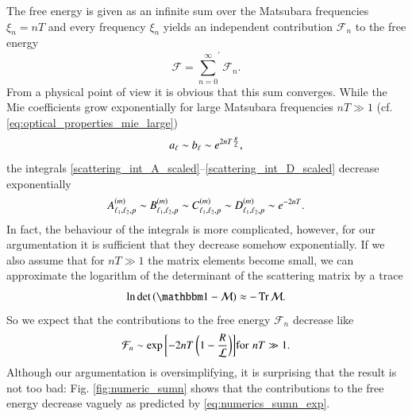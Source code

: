 The free energy is given as an infinite sum over the Matsubara frequencies
$\xi_n=nT$ and every frequency $\xi_n$ yields an independent
contribution $\mathcal{F}_n$ to the free energy
\begin{equation}
\mathcal{F} = {\sum_{n=0}^\infty}^\prime \mathcal{F}_n.
\end{equation}
From a physical point of view it is obvious that this sum converges.
While the Mie coefficients grow exponentially for large Matsubara
frequencies $nT\gg1$ (cf. \eqref{eq:optical_properties_mie_large})
\begin{equation}
a_\ell \sim b_\ell \sim e^{2nT \frac{R}{\mathcal{L}}},
\end{equation}
the integrals \eqref{scattering_int_A_scaled}--\eqref{scattering_int_D_scaled} decrease exponentially
\begin{equation}
A_{\ell_1,\ell_2,p}^{(m)} \sim B_{\ell_1,\ell_2,p}^{(m)} \sim C_{\ell_1,\ell_2,p}^{(m)} \sim D_{\ell_1,\ell_2,p}^{(m)} \sim e^{-2nT}.
\end{equation}
In fact, the behaviour of the integrals is more complicated, however, for our
argumentation it is sufficient that they decrease somehow exponentially.
If we also assume that for $nT\gg1$ the matrix elements become small,
we can approximate the logarithm of the determinant of the scattering
matrix by a trace
\begin{equation}
\log \det \left(\Id - \mathcal{M}\right) \approx - \Tr \mathcal{M}.
\end{equation}
So we expect that the contributions to the free energy
$\mathcal{F}_n$ decrease like
\begin{equation}
\label{eq:numerics_sumn_exp}
\mathcal{F}_n \sim \exp{\left[-2nT\left(1-\frac{R}{\mathcal{L}}\right)\right]} \\ \text{for} \, \, nT \gg 1.
\end{equation}
Although our argumentation is oversimplifying, it is surprising that the result
is not too bad: Fig. \ref{fig:numeric_sumn} shows that the contributions to the
free energy decrease vaguely as predicted by \eqref{eq:numerics_sumn_exp}.

